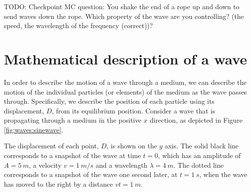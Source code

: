 TODO: Checkpoint MC question: You shake the end of a rope up and down to send waves down the rope. Which property of the wave are you controlling? (the speed, the wavelength of the frequency (correct))?

\section{Mathematical description of a wave}
In order to describe the motion of a wave through a medium, we can describe the motion of the individual particles (or elements) of the medium as the wave passes through. Specifically, we describe the position of each particle using its displacement, $D$, from its equilibrium position. Consider a wave that is propagating through a medium in the positive $x$ direction, as depicted in Figure \ref{fig:waves:sinewave}.

The displacement of each point, $D$, is shown on the $y$ axis. The solid black line corresponds to a snapshot of the wave at time $t=0$, which has an amplitude of $A=\SI{5}{m}$, a velocity $v=\SI{1}{m/s}$ and a wavelength $\lambda=\SI{4}{m}$. The dotted line corresponds to a snapshot of the wave one second later, at $t=\SI{1}{s}$, when the wave has moved to the right by a distance $vt=\SI{1}{m}$.

